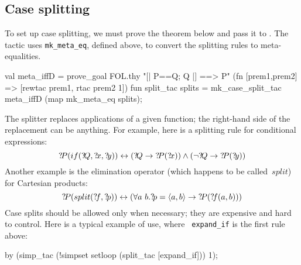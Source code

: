 \subsection{Case splitting}
To set up case splitting, we must prove the theorem below and pass it to
.  The tactic  uses
{\tt mk_meta_eq}, defined above, to convert the splitting rules to
meta-equalities.
\begin{ttbox}
val meta_iffD = 
    prove_goal FOL.thy "[| P==Q; Q |] ==> P"
        (fn [prem1,prem2] => [rewtac prem1, rtac prem2 1])
\ttbreak
fun split_tac splits =
    mk_case_split_tac meta_iffD (map mk_meta_eq splits);
\end{ttbox}
%
The splitter replaces applications of a given function; the right-hand side
of the replacement can be anything.  For example, here is a splitting rule
for conditional expressions:
\[ \Var{P}(if(\Var{Q},\Var{x},\Var{y})) \bimp (\Var{Q} \imp \Var{P}(\Var{x}))
\conj (\lnot\Var{Q} \imp \Var{P}(\Var{y})) 
\] 
Another example is the elimination operator (which happens to be
called~$split$) for Cartesian products:
\[ {?\!P}(split({?\!f},{?\!p})) \leftrightarrow (\forall a~b. {?\!p} =
\langle a,b\rangle \rightarrow {?\!P}({?\!f}(a,b))) 
\] 
Case splits should be allowed only when necessary; they are expensive
and hard to control.  Here is a typical example of use, where {\tt
  expand_if} is the first rule above:
\begin{ttbox}
by (simp_tac (!simpset setloop (split_tac [expand_if])) 1);
\end{ttbox}





